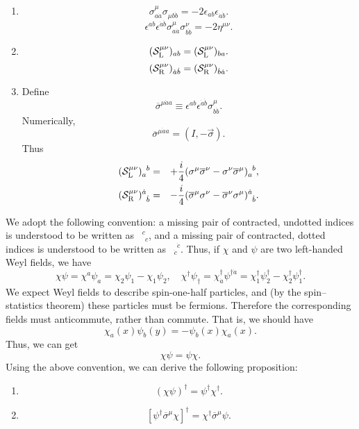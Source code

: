 \begin{newprop}
\begin{enumerate}
\item 
\[\sigma^{\mu}_{a\dot{a}} \sigma_{\mu b\dot{b}} = -2\epsilon_{ab} \epsilon_{\dot{a}\dot{b}}.\]
\[\epsilon^{ab}\epsilon^{\dot{a}\dot{b}} \sigma^{\mu}_{a\dot{a}} \sigma^{\nu}_{b\dot{b}} = -2\eta^{\mu\nu}.\]
\item \[(\mathcal{S}_{\rm L}^{\mu\nu})_{ab} = (\mathcal{S}_{\rm L}^{\mu\nu})_{ba}.\]
\[(\mathcal{S}_{\rm R}^{\mu\nu})_{\dot{a}\dot{b}} = (\mathcal{S}_{\rm R}^{\mu\nu})_{\dot{b}\dot{a}}.\]
\item Define
\[\overline{\sigma}^{\mu \dot{a} a} \equiv \epsilon^{ab} \epsilon^{\dot{a}\dot{b}} \sigma^{\mu}_{b\dot{b}}.\]
Numerically,
\[\overline{\sigma}^{\mu \dot{a} a} = (I , -\vec{\sigma}).\]
Thus
\begin{eqnarray}
(\mathcal{S}_{\rm L}^{\mu\nu})_a^{\phantom{a}b} &=& + \frac{i}{4} (\sigma^{\mu} \overline{\sigma}^{\nu} - \sigma^{\nu} \overline{\sigma}^{\mu})_a^{\phantom{a}b}, \nonumber \\
(\mathcal{S}_{\rm R}^{\mu\nu})^{\dot{a}}_{\phantom{\dot{a}} \dot{b}} &=& - \frac{i}{4}(\overline{\sigma}^{\mu}\sigma^{\nu} - \overline{\sigma}^{\nu} \sigma^{\mu})^{\dot{a}}_{\phantom{\dot{a}} \dot{b}}. \nonumber
\end{eqnarray}
\end{enumerate}
\end{newprop}

\noindent
We adopt the following convention: a missing pair of contracted,
undotted indices is understood to be written as $\phantom{1}^c_{\phantom{c}c}$, and a missing pair of
contracted, dotted indices is understood to be written as $\phantom{1}_{\dot{c}}^{\phantom{c}\dot{c}}$. Thus, if $\chi$ and
$\psi$ are two left-handed Weyl fields, we have
\[\chi \psi = \chi^{a}\psi_{a} = \chi_2\psi_1 - \chi_1\psi_2, \quad \chi^{\dagger} \psi_{\dagger} = \chi^{\dagger}_{\dot{a}} \psi^{\dagger \dot{a}} = \chi_1^{\dagger}\psi_2^{\dagger} - \chi_2^{\dagger} \psi_1^{\dagger}.\]
We expect Weyl fields to describe spin-one-half particles, and (by the spin--statistics theorem) these particles must be fermions. Therefore the corresponding fields must anticommute, rather than commute. That is, we should have
\[\chi_a(x) \psi_b(y) = - \psi_b(x) \chi_a(x).\]
Thus, we can get
\[\chi\psi = \psi\chi.\]
Using the above convention, we can derive the following proposition:

\begin{newprop}
\begin{enumerate}
\item \[(\chi\psi)^{\dagger} = \psi^{\dagger}\chi^{\dagger}.\]
\item \[[\psi^{\dagger} \overline{\sigma}^{\mu} \chi]^{\dagger} = \chi^{\dagger} \overline{\sigma}^{\mu} \psi.\]
\end{enumerate}
\end{newprop}

